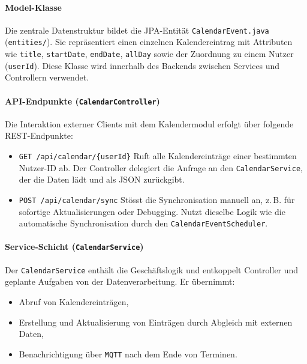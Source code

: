 \documentclass[12pt,a4paper]{report}
\begin{document}
\paragraph{Model-Klasse}
Die zentrale Datenstruktur bildet die JPA-Entität \texttt{CalendarEvent.java} (\texttt{entities/}).
Sie repräsentiert einen einzelnen Kalendereintrag mit Attributen wie \texttt{title}, \texttt{startDate}, \texttt{endDate}, \texttt{allDay} sowie der Zuordnung zu einem Nutzer (\texttt{userId}).
Diese Klasse wird innerhalb des Backends zwischen Services und Controllern verwendet.

\paragraph{API-Endpunkte (\texttt{CalendarController})}
Die Interaktion externer Clients mit dem Kalendermodul erfolgt über folgende REST-Endpunkte:
\begin{itemize}
  \item \texttt{GET /api/calendar/\{userId\}}
        Ruft alle Kalendereinträge einer bestimmten Nutzer-ID ab.
        Der Controller delegiert die Anfrage an den \texttt{CalendarService}, der die Daten lädt und als JSON zurückgibt.
  \item \texttt{POST /api/calendar/sync}
        Stösst die Synchronisation manuell an, z.\,B. für sofortige Aktualisierungen oder Debugging.
        Nutzt dieselbe Logik wie die automatische Synchronisation durch den \texttt{CalendarEventScheduler}.
\end{itemize}

\paragraph{Service-Schicht (\texttt{CalendarService})}
Der \texttt{CalendarService} enthält die Geschäftslogik und entkoppelt Controller und geplante Aufgaben von der Datenverarbeitung.
Er übernimmt:
\begin{itemize}
  \item Abruf von Kalendereinträgen,
  \item Erstellung und Aktualisierung von Einträgen durch Abgleich mit externen Daten,
  \item Benachrichtigung über \texttt{MQTT} nach dem Ende von Terminen.

\end{itemize}
\end{document}
